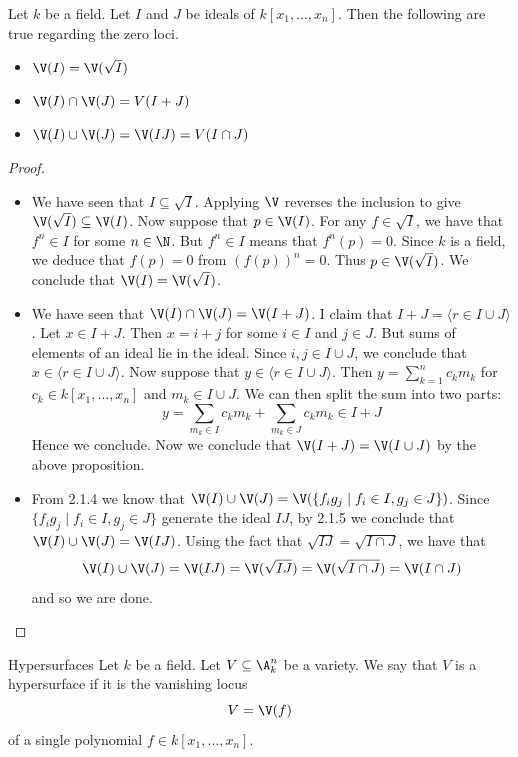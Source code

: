 \documentclass[a4paper]{article}
\begin{document}
\begin{prp}{}{} Let $k$ be a field. Let $I$ and $J$ be ideals of $k[x_1,\dots,x_n]$. Then the following are true regarding the zero loci. 
\begin{itemize}
\item $\V(I)=\V(\sqrt{I})$
\item $\V(I)\cap\V(J)=V(I+J)$
\item $\V(I)\cup\V(J)=\V(IJ)=V(I\cap J)$
\end{itemize}
\begin{proof}~\\
\begin{itemize}
\item We have seen that $I\subseteq\sqrt{I}$. Applying $\V$ reverses the inclusion to give $\V(\sqrt{I})\subseteq\V(I)$. Now suppose that $p\in\V(I)$. For any $f\in\sqrt{I}$, we have that $f^n\in I$ for some $n\in\N$. But $f^n\in I$ means that $f^n(p)=0$. Since $k$ is a field, we deduce that $f(p)=0$ from $(f(p))^n=0$. Thus $p\in\V(\sqrt{I})$. We conclude that $\V(I)=\V(\sqrt{I})$. 
\item We have seen that $\V(I)\cap\V(J)=\V(I+J)$. I claim that $I+J=\langle r\in I\cup J\rangle$. Let $x\in I+J$. Then $x=i+j$ for some $i\in I$ and $j\in J$. But sums of elements of an ideal lie in the ideal. Since $i,j\in I\cup J$, we conclude that $x\in\langle r\in I\cup J\rangle$. Now suppose that $y\in\langle r\in I\cup J\rangle$. Then $y=\sum_{k=1}^nc_km_k$ for $c_k\in k[x_1,\dots,x_n]$ and $m_k\in I\cup J$. We can then split the sum into two parts: $$y=\sum_{m_k\in I}c_km_k+\sum_{m_k\in J}c_km_k\in I+J$$ Hence we conclude. Now we conclude that $\V(I+J)=\V(I\cup J)$ by the above proposition. 
\item From 2.1.4 we know that $\V(I)\cup\V(J)=\V(\{f_ig_j\;|\;f_i\in I, g_j\in J\})$. Since $\{f_ig_j\;|\;f_i\in I,g_j\in J\}$ generate the ideal $IJ$, by 2.1.5 we conclude that $\V(I)\cup\V(J)=\V(IJ)$. Using the fact that $\sqrt{IJ}=\sqrt{I\cap J}$, we have that $$\V(I)\cup\V(J)=\V(IJ)=\V(\sqrt{IJ})=\V(\sqrt{I\cap J})=\V(I\cap J)$$ and so we are done. 
\end{itemize}
\end{proof}
\end{prp}

\begin{defn}{Hypersurfaces}{} Let $k$ be a field. Let $V\subseteq\A_k^n$ be a variety. We say that $V$ is a hypersurface if it is the vanishing locus $$V=\V(f)$$ of a single polynomial $f\in k[x_1,\dots,x_n]$. 
\end{defn}
\end{document}
